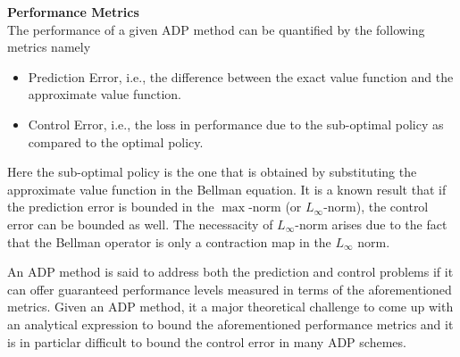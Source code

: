 \textbf{Performance Metrics}\\
The performance of a given ADP method can be quantified by the following metrics namely
\begin{itemize}
\item Prediction Error, i.e., the difference between the exact value function and the approximate value function.
\item Control Error, i.e., the loss in performance due to the sub-optimal policy as compared to the optimal policy.
\end{itemize}
Here the sub-optimal policy is the one that is obtained by substituting the approximate value function in the Bellman equation.
It is a known result that if the prediction error is bounded in the $\max$-norm (or $L_\infty$-norm), the control error can be bounded as well. The necessacity of $L_\infty$-norm  arises due to the fact that the Bellman operator is only a contraction map in the $L_\infty$ norm.\par
An ADP method is said to address both the prediction and control problems if it can offer guaranteed performance levels measured in terms of the aforementioned metrics. Given an ADP method, it a major theoretical challenge to come up with an analytical expression to bound the aforementioned performance metrics and it is in particlar difficult to bound the control error in many ADP schemes.\par
